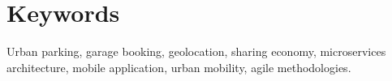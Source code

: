 \section{Keywords}

Urban parking, garage booking, geolocation, sharing economy, microservices architecture, mobile application, urban mobility, agile methodologies.
